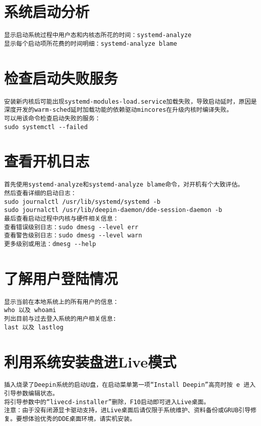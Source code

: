 \documentclass[a4paper,fontset=fandol,zihao=-4,linespread=1.2,oneside]{ctexbook}
\begin{document}
\section{系统启动分析}
\begin{lstlisting}
显示启动系统过程中用户态和内核态所花的时间：systemd-analyze
显示每个启动项所花费的时间明细：systemd-analyze blame
\end{lstlisting}

\section{检查启动失败服务}
\begin{lstlisting}
安装新内核后可能出现systemd-modules-load.service加载失败，导致启动延时，原因是深度开发的warm-sched延时加载功能的依赖驱动mincores在升级内核时编译失败。
可以用该命令检查启动失败的服务：
sudo systemctl --failed
\end{lstlisting}

\section{查看开机日志}
\begin{lstlisting}
首先使用systemd-analyze和systemd-analyze blame命令，对开机有个大致评估。
然后查看详细的启动日志：
sudo journalctl /usr/lib/systemd/systemd -b
sudo journalctl /usr/lib/deepin-daemon/dde-session-daemon -b
最后查看启动过程中内核与硬件相关信息：
查看错误级别日志：sudo dmesg --level err
查看警告级别日志：sudo dmesg --level warn
更多级别或用法：dmesg --help
\end{lstlisting}

\section{了解用户登陆情况}
\begin{lstlisting}
显示当前在本地系统上的所有用户的信息：
who 以及 whoami
列出目前与过去登入系统的用户相关信息:
last 以及 lastlog
\end{lstlisting}

\section{利用系统安装盘进Live模式}
\begin{lstlisting}
插入烧录了Deepin系统的启动U盘，在启动菜单第一项“Install Deepin”高亮时按 e 进入引导参数编辑状态。
将引导参数中的“livecd-installer”删除，F10启动即可进入Live桌面。
注意：由于没有闭源显卡驱动支持，进Live桌面后请仅限于系统维护、资料备份或GRUB引导修复。要想体验优秀的DDE桌面环境，请实机安装。
\end{lstlisting}
\end{document}
